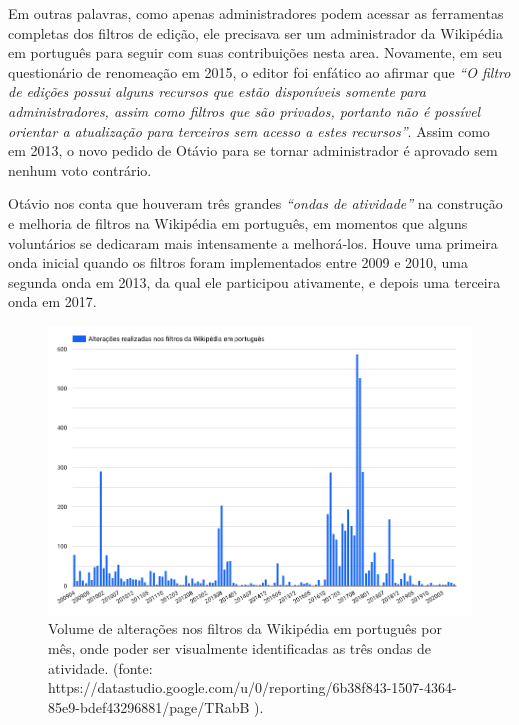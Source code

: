 Em outras palavras, como apenas administradores podem acessar as ferramentas completas dos filtros de edição, ele precisava ser um administrador da Wikipédia em português para seguir com suas contribuições nesta area. Novamente, em seu questionário de renomeação em 2015, o editor foi enfático ao afirmar que \textit{``O filtro de edições possui alguns recursos que estão disponíveis somente para administradores, assim como filtros que são privados, portanto não é possível orientar a atualização para terceiros sem acesso a estes recursos''}. Assim como em 2013, o novo pedido de Otávio para se tornar administrador é aprovado sem nenhum voto contrário.


Otávio nos conta que houveram três grandes \textit{``ondas de atividade''} na construção e melhoria de filtros na Wikipédia em português, em momentos que alguns voluntários se dedicaram mais intensamente a melhorá-los. Houve uma primeira onda inicial quando os filtros foram implementados entre 2009 e 2010, uma segunda onda em 2013, da qual ele participou ativamente, e depois uma terceira onda em 2017. 

\begin{figure}[H]
    \centering
    \includegraphics[width=1\textwidth]{Images/grafico_alteracoes_filtros.png}
    \caption{Volume de alterações nos filtros da Wikipédia em português por mês, onde poder ser visualmente identificadas as três ondas de atividade. (fonte: https://datastudio.google.com/u/0/reporting/6b38f843-1507-4364-85e9-bdef43296881/page/TRabB ).}
    \label{fig:grafico_alteracoes_filtros}
\end{figure}

